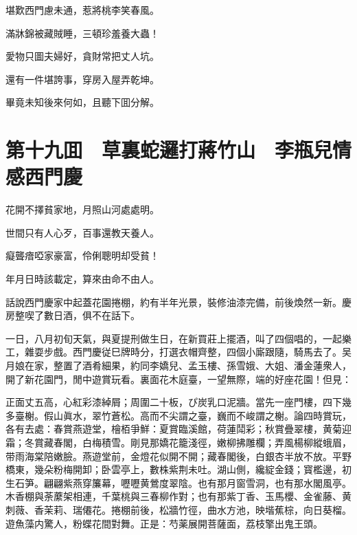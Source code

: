 堪歎西門慮未通，惹將桃李笑春風。

滿牀錦被藏賊睡，三頓珍羞養大蟲！

愛物只圖夫婦好，貪財常把丈人坑。

還有一件堪誇事，穿房入屋弄乾坤。

畢竟未知後來何如，且聽下囬分解。

\chapter*{第十九囬　草裏蛇邏打蔣竹山　李瓶兒情感西門慶}

花開不擇貧家地，月照山河處處明。

世間只有人心歹，百事還教天養人。

癡聾瘖啞家豪富，伶俐聰明却受貧！

年月日時該載定，算來由命不由人。

話說西門慶家中起蓋花園捲棚，約有半年光景，裝修油漆完備，前後煥然一新。慶房整喫了數日酒，俱不在話下。

一日，八月初旬天氣，與夏提刑做生日，在新買莊上擺酒，叫了四個唱的，一起樂工，雜耍步戲。西門慶従巳牌時分，打選衣帽齊整，四個小廝跟隨，騎馬去了。吴月娘在家，整置了酒肴細果，約同李嬌兒、孟玉樓、孫雪娥、大姐、潘金蓮衆人，開了新花園門，閒中遊賞玩看。裏面花木庭臺，一望無際，端的好座花園！但見：

正面丈五高，心紅彩漆綽屑；周圍二十板，ぴ炭乳口泥牆。當先一座門樓，四下幾多臺榭。假山眞水，翠竹蒼松。高而不尖謂之臺，巍而不峻謂之榭。論四時賞玩，各有去處：春賞燕遊堂，檜栢爭鮮：夏賞臨溪館，荷蓮鬦彩；秋賞疊翠樓，黄菊迎霜；冬賞藏春閣，白梅積雪。剛見那嬌花籠淺徑，嫩柳拂雕欄；弄風楊柳縱蛾眉，带雨海棠陪嫩臉。燕遊堂前，金燈花似開不開；藏春閣後，白銀杏半放不放。平野橋東，幾朵粉梅開卸；卧雲亭上，數株紫荆未吐。湖山側，纔綻金錢；寳檻邊，初生石笋。翩翩紫燕穿簾幕，嚦嚦黄鶯度翠陰。也有那月窗雪洞，也有那水閣風亭。木香棚與荼䕷架相連，千葉桃與三春柳作對；也有那紫丁香、玉馬櫻、金雀藤、黄刺薇、香茉莉、瑞僊花。捲棚前後，松牆竹徑，曲水方池，映堦蕉棕，向日葵榴。遊魚藻内驚人，粉蝶花間對舞。正是：芍薬展開菩薩面，荔枝擎出鬼王頭。

